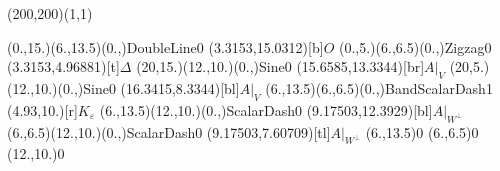 \unitlength=1bp%

\begin{feynartspicture}(200,200)(1,1)

\FADiagram{}
\FAProp(0.,15.)(6.,13.5)(0.,){DoubleLine}{0}
\FALabel(3.3153,15.0312)[b]{$O$}
\FAProp(0.,5.)(6.,6.5)(0.,){Zigzag}{0}
\FALabel(3.3153,4.96881)[t]{$\Delta$}
\FAProp(20,15.)(12.,10.)(0.,){Sine}{0}
\FALabel(15.6585,13.3344)[br]{$A|_V$}
\FAProp(20,5.)(12.,10.)(0.,){Sine}{0}
\FALabel(16.3415,8.3344)[bl]{$A|_V$}
\FAProp(6.,13.5)(6.,6.5)(0.,){BandScalarDash}{1}
\FALabel(4.93,10.)[r]{$K_\varepsilon$}
\FAProp(6.,13.5)(12.,10.)(0.,){ScalarDash}{0}
\FALabel(9.17503,12.3929)[bl]{$A|_{W^\perp}$}
\FAProp(6.,6.5)(12.,10.)(0.,){ScalarDash}{0}
\FALabel(9.17503,7.60709)[tl]{$A|_{W^\perp}$}
\FAVert(6.,13.5){0}
\FAVert(6.,6.5){0}
\FAVert(12.,10.){0}
\end{feynartspicture}

